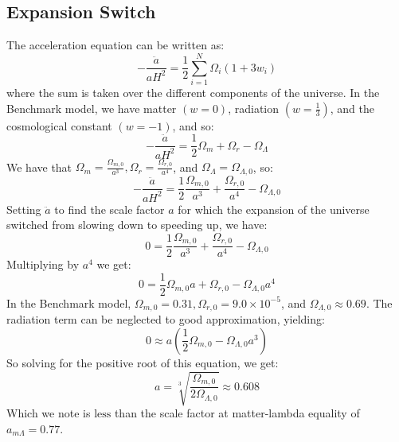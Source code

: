 \subsection{Expansion Switch}
The acceleration equation can be written as:
\begin{equation}
    -\frac{\ddot{a}}{aH^2} = \frac{1}{2}\sum_{i=1}^N \Omega_i(1+3w_i)
\end{equation}
where the sum is taken over the different components of the universe. In the Benchmark model, we have matter $(w = 0)$, radiation $(w = \frac{1}{3})$, and the cosmological constant $(w = -1)$, and so:
\begin{equation}
    -\frac{\ddot{a}}{aH^2} = \frac{1}{2}\Omega_m + \Omega_r - \Omega_\Lambda
\end{equation}
We have that $\Omega_m = \frac{\Omega_{m, 0}}{a^3}, \Omega_r = \frac{\Omega_{r, 0}}{a^4}$, and $\Omega_\Lambda = \Omega_{\Lambda, 0}$, so:
\begin{equation}
    -\frac{\ddot{a}}{aH^2} = \frac{1}{2}\frac{\Omega_{m, 0}}{a^3} + \frac{\Omega_{r, 0}}{a^4} - \Omega_{\Lambda, 0}
\end{equation}
Setting $\ddot{a}$ to find the scale factor $a$ for which the expansion of the universe switched from slowing down to speeding up, we have:
\begin{equation}
    0 =  \frac{1}{2}\frac{\Omega_{m, 0}}{a^3} + \frac{\Omega_{r, 0}}{a^4} - \Omega_{\Lambda, 0}
\end{equation}
Multiplying by $a^4$ we get:
\begin{equation}
    0 = \frac{1}{2}\Omega_{m, 0}a + \Omega_{r, 0} - \Omega_{\Lambda, 0}a^4
\end{equation}
In the Benchmark model, $\Omega_{m, 0} = 0.31, \Omega_{r, 0} = 9.0 \times 10^{-5}$, and $\Omega_{\Lambda, 0} \approx 0.69$. The radiation term can be neglected to good approximation, yielding:
\begin{equation}
    0 \approx a(\frac{1}{2}\Omega_{m, 0} - \Omega_{\Lambda, 0}a^3)
\end{equation}
So solving for the positive root of this equation, we get:
\begin{equation}
    \boxed{a = \sqrt[3]{\frac{\Omega_{m, 0}}{2\Omega_{\Lambda, 0}}} \approx 0.608}
\end{equation}
Which we note is $\boxed{\text{less}}$ than the scale factor at matter-lambda equality of $a_{m\Lambda} = 0.77$. 